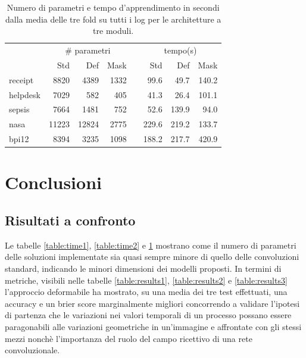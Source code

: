 \documentclass[12pt,a4paper]{report}
\begin{document}
    \begin{table}[t]
    \caption{Numero di parametri e tempo d'apprendimento in secondi 
        dalla media delle tre fold su tutti i log per le architetture
        a tre moduli.}
    \begin{center} \label{table:time3}
    \begin{tabular}{l rrrcrrr}
    \hline
    & \multicolumn{3}{c}{\# parametri} & & \multicolumn{3}{c}{tempo(s)} \\
    & Std & Def & Mask & & Std & Def & Mask \\
    \cline{2-4} \cline{6-8}
    receipt     &  8820 &  4389 & 1332 & &  99.6 &  49.7 & 140.2 \\
    helpdesk    &  7029 &   582 &  405 & &  41.3 &  26.4 & 101.1 \\
    sepsis      &  7664 &  1481 &  752 & &  52.6 & 139.9 &  94.0 \\ 
    nasa        & 11223 & 12824 & 2775 & & 229.6 & 219.2 & 133.7 \\ 
    bpi12       &  8394 &  3235 & 1098 & & 188.2 & 217.7 & 420.9 \\ 
    \hline
    \end{tabular}
    \end{center}
    \end{table}

    \newpage
    \section{Conclusioni}
    \subsection{Risultati a confronto}
    Le tabelle \ref{table:time1}, \ref{table:time2} e \ref{table:time3}
    mostrano come il numero di parametri delle soluzioni implementate
    sia quasi sempre minore di quello delle convoluzioni standard,
    indicando le minori dimensioni dei modelli proposti.
    In termini di metriche, visibili nelle tabelle \ref{table:results1}, 
    \ref{table:results2} e \ref{table:results3} l'approccio deformabile 
    ha mostrato, su una media dei tre test effettuati, una accuracy e un brier 
    score marginalmente migliori concorrendo a validare l'ipotesi di partenza che le
    variazioni nei valori temporali di un processo possano essere paragonabili alle 
    variazioni geometriche in un'immagine e affrontate con gli stessi mezzi
    nonch\`e l'importanza del ruolo del campo ricettivo di una rete convoluzionale.
\end{document}
